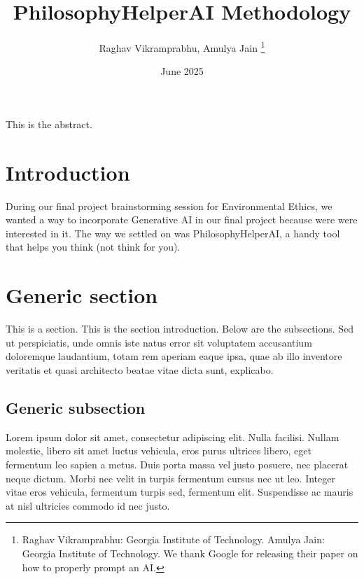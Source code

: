 \documentclass[letterpaper,11pt,leqno]{article}
\begin{document}
\title{PhilosophyHelperAI Methodology}

\author{Raghav Vikramprabhu, Amulya Jain
%
\thanks{Raghav Vikramprabhu: Georgia Institute of Technology. Amulya Jain: Georgia Institute of Technology. We thank Google for releasing their paper on how to properly prompt an AI.}}

\date{June 2025}   


\begin{titlepage}
\maketitle

This is the abstract. 

\end{titlepage}


\section{Introduction}\label{s:introduction}
 
During our final project brainstorming session for Environmental Ethics, we wanted a way to incorporate Generative AI in our final project because were were interested in it. The way we settled on was PhilosophyHelperAI, a handy tool that helps you think (not think for you). \cite{GoogleAIDev}


\section{Generic section}\label{s:section}

This is a section. This is the section introduction. Below are the subsections. Sed ut perspiciatis, unde omnis iste natus error sit voluptatem accusantium doloremque laudantium, totam rem aperiam eaque ipsa, quae ab illo inventore veritatis et quasi architecto beatae vitae dicta sunt, explicabo. \cite{PromptEngineering}

\subsection{Generic subsection}

Lorem ipsum dolor sit amet, consectetur adipiscing elit. Nulla facilisi. Nullam molestie, libero sit amet luctus vehicula, eros purus ultrices libero, eget fermentum leo sapien a metus. Duis porta massa vel justo posuere, nec placerat neque dictum. Morbi nec velit in turpis fermentum cursus nec ut leo. Integer vitae eros vehicula, fermentum turpis sed, fermentum elit. Suspendisse ac mauris at nisl ultricies commodo id nec justo. 

\pagebreak

\printbibliography
\end{document}
